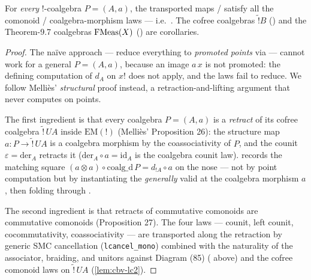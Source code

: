 \begin{theorem}\label{lem:cbv-emcomon-all}
\rocqok
{}
For \emph{every} $\mathord{!}$-coalgebra $P = (A, a)$, the transported
maps  /
 satisfy all the comonoid /
coalgebra-morphism laws --- i.e.\ .
The cofree coalgebras $\widetilde{\mathord{!}}B$
() and the Theorem-9.7
coalgebras $\mathrm{FMeas}(X)$
() are corollaries.
\end{theorem}

\begin{proof}
The naïve approach --- reduce everything to \emph{promoted points} via
 --- cannot work for a
general $P = (A, a)$, because an image $a\,x$ is not promoted: the
defining computation of $d_A$ on $x!$ does not apply, and the laws fail
to reduce. We follow Melli\`es' \emph{structural} proof instead, a
retraction-and-lifting argument that never computes on points.

The first ingredient is that every coalgebra $P = (A, a)$ is a
\emph{retract} of its cofree coalgebra $\widetilde{\mathord{!}}\,UA$
inside $\mathrm{EM}(\mathord{!})$ (Melli\`es' Proposition 26): the
structure map $a : P \to \widetilde{\mathord{!}}\,UA$ is a coalgebra
morphism by the coassociativity of $P$, and the counit
$\varepsilon = \mathrm{der}_A$ retracts it
($\mathrm{der}_A \circ a = \mathrm{id}_A$ is the coalgebra counit law).
 records the matching square
$(a \otimes a) \circ \mathrm{coalg\_d}\,P = d_{\mathord{!}A} \circ a$
on the nose --- not by point computation but by instantiating the
\emph{generally} valid  at
the coalgebra morphism $a$, then folding through
.

The second ingredient is that retracts of commutative comonoids are
commutative comonoids (Proposition 27). The four laws --- counit, left
counit, cocommutativity, coassociativity --- are transported along the
retraction by generic SMC cancellation
(\texttt{lcancel\_mono}) combined with the naturality of the associator,
braiding, and unitors against Diagram (85)
( above) and the cofree
comonoid laws on $\widetilde{\mathord{!}}\,UA$
(\autoref{lem:cbv-lc2}).


\end{proof}

